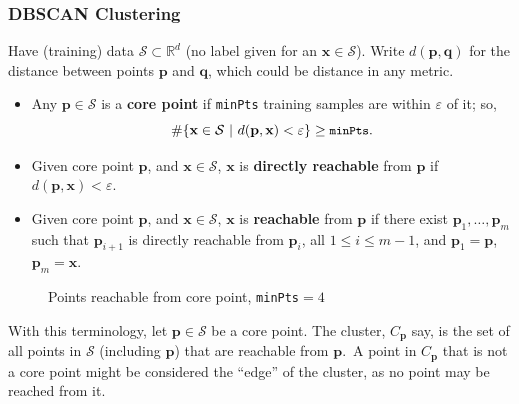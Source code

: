 \documentclass[smaller]{beamer}
\theoremstyle{example}
\newcommand{\ttt}[1]{{\small\texttt{#1}}}
\newcommand{\x}{\textbf{x}}
\begin{document}
\begin{frame}
    \frametitle{DBSCAN Clustering}
    Have (training) data $\mathcal S \subset\mathbb R^d$ (no label given for an $\x\in\mathcal S$). Write $d(\textbf{p}, \textbf{q})$ for the distance between points $\textbf{p}$ and $\textbf{q}$, which could be distance in any metric.
    \pause
    \begin{itemize}
        \item Any $\textbf{p}\in\mathcal S$ is a \textbf{core point} if \ttt{minPts} training samples are within $\varepsilon$ of it; so,
            \[\#\{\x\in\mathcal S\ |\ d(\textbf{p}, \x) < \varepsilon\} \ge \ttt{minPts}.\]
        \item  \pause Given core point $\textbf{p}$, and $\x \in \mathcal S$, $\x$ is \textbf{directly reachable} from $\textbf{p}$ if $d(\textbf{p}, \x) < \varepsilon$. 
        \pause
        \item Given core point $\textbf{p}$, and $\x \in \mathcal S$, $\x$ is \textbf{reachable} from $\textbf{p}$ if there exist $\textbf{p}_1, \ldots, \textbf{p}_m$ such that $\textbf{p}_{i+1}$ is directly reachable from $\textbf{p}_i$, all $1\le i \le m-1$, and $\textbf{p}_1=\textbf{p}$, $\textbf{p}_m=\x$.
    \end{itemize}
    
    
    \begin{minipage}{\textwidth}
        \begin{figure}
            \vspace{-2\baselineskip}
            \caption{Points reachable from core point, \ttt{minPts}$=4$}
        \end{figure}
    
    \pause
    \vspace{\baselineskip}
    With this terminology, let $\textbf{p}\in\mathcal S$ be a core point. The cluster, $C_{\textbf{p}}$ say, is the set of all points in $\mathcal S$ (including $\textbf{p}$) that are reachable from $\textbf{p}$.\pause \ A point in $C_{\textbf{p}}$ that is not a core point might be considered the ``edge'' of the cluster, as no point may be reached from it.
    \end{minipage}
\end{frame}
\end{document}
